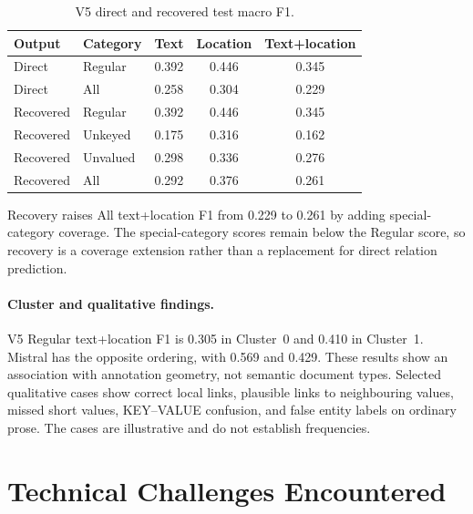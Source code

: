 \documentclass[11pt,a4paper]{article}
\begin{document}
\begin{table}[H]
  \centering
  \caption{V5 direct and recovered test macro F1.}
  \label{tab:pr-v5-recovery}
  \begin{tabular}{llccc}
    \toprule
    \textbf{Output} & \textbf{Category} & \textbf{Text} & \textbf{Location} & \textbf{Text+location} \\
    \midrule
    Direct & Regular & 0.392 & 0.446 & 0.345 \\
    Direct & All & 0.258 & 0.304 & 0.229 \\
    \midrule
    Recovered & Regular & 0.392 & 0.446 & 0.345 \\
    Recovered & Unkeyed & 0.175 & 0.316 & 0.162 \\
    Recovered & Unvalued & 0.298 & 0.336 & 0.276 \\
    Recovered & All & 0.292 & 0.376 & 0.261 \\
    \bottomrule
  \end{tabular}
\end{table}

Recovery raises All text+location F1 from 0.229 to 0.261 by adding
special-category coverage. The special-category scores remain below the Regular
score, so recovery is a coverage extension rather than a replacement for direct
relation prediction.

\paragraph{Cluster and qualitative findings.}
V5 Regular text+location F1 is 0.305 in Cluster~0 and 0.410 in Cluster~1.
Mistral has the opposite ordering, with 0.569 and 0.429. These results show an
association with annotation geometry, not semantic document types. Selected
qualitative cases show correct local links, plausible links to neighbouring
values, missed short values, KEY--VALUE confusion, and false entity labels on
ordinary prose. The cases are illustrative and do not establish frequencies.

\section{Technical Challenges Encountered}
\end{document}
